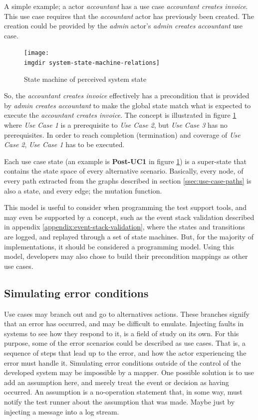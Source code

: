 \noindent A simple example; a actor \emph{accountant} has a use case \emph{accountant creates invoice}. This use case requires that the \emph{accountant} actor has previously been created. The creation could be provided by the \emph{admin} actor's \emph{admin creates accountant} use case.
\begin{figure}[h]
\texttt{[image: \\imgdir system-state-machine-relations]}
\centering
\caption{State machine of perceived system state}
\label{fig:system-state-machine-relations}
\end{figure}
So, the \emph{accountant creates invoice} effectively has a precondition that is provided by \emph{admin creates accountant} to make the global state match what is expected to execute the \emph{accountant creates invoice}. The concept is illustrated in figure \ref{fig:system-state-machine-relations} where \emph{Use Case 1} is a prerequisite to \emph{Use Case 2}, but \emph{Use Case 3} has no prerequisites. In order to reach completion (termination) and coverage of \emph{Use Case 2}, \emph{Use Case 1} has to be executed.\smallskip

\noindent Each use case state (an example is \textbf{Post-UC1} in figure \ref{fig:system-state-machine-relations}) is a super-state that contains the state space of every alternative scenario. Basically, every node, of every path extracted from the graphs described in section \ref{ssec:use-case-paths} is also a state, and every edge; the mutation function.\medskip

\noindent This model is useful to consider when programming the test support tools, and may even be supported by a concept, such as the event stack validation described in appendix \ref{appendix:event-stack-validation}, where the states and transitions are logged, and replayed through a set of state machines. But, for the majority of implementations, it should be considered a programming model. Using this model, developers may also chose to build their precondition mappings as other use cases.

\subsection{Simulating error conditions}
\label{ssec:simulating-error-conditions}
Use cases may branch out and go to alternatives actions. These branches signify that an error has occurred, and may be difficult to emulate. Injecting faults in systems to see how they respond to it, is a field of study on its own. For this purpose, some of the error scenarios could be described as use cases. That is, a sequence of steps that lead up to the error, and how the actor experiencing the error must handle it. Simulating error conditions outside of the control of the developed system may be impossible by a mapper. One possible solution is to use add an assumption here, and merely treat the event or decision as having occurred. An assumption is a no-operation statement that, in some way, must notify the test runner about the assumption that was made. Maybe just by injecting a message into a log stream.

